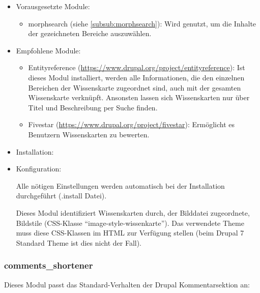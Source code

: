 \begin{itemize}[parsep=0pt, itemsep=5.0pt plus 2.0pt minus 1.0pt, leftmargin=*]
	\item Vorausgesetzte Module:

	\begin{itemize}
		\item morphsearch (siehe \cref{subsub:morphsearch}): Wird genutzt, um die Inhalte der gezeichneten Bereiche auszuwählen.
	\end{itemize}


	\item Empfohlene Module:

	\begin{itemize}
		\item Entityreference (\url{https://www.drupal.org/project/entityreference}): Ist dieses Modul installiert, werden alle Informationen, die den einzelnen Bereichen der Wissenskarte zugeordnet sind, auch mit der gesamten Wissenskarte verknüpft. Ansonsten lassen sich Wissenskarten nur über Titel und Beschreibung per Suche finden.

		\item Fivestar (\url{https://www.drupal.org/project/fivestar}): Ermöglicht es Benutzern Wissenskarten zu bewerten.
	\end{itemize}


	\item Installation: \standardinstall


	\item Konfiguration:

	\noconfig

	Alle nötigen Einstellungen werden automatisch bei der Installation durchgeführt (.install Datei).

	Dieses Modul identifiziert Wissenskarten durch, der Bilddatei zugeordnete, Bildstile (\zB CSS-Klasse \enquote{image-style-wissenkarte}). Das verwendete Theme muss diese CSS-Klassen im HTML zur Verfügung stellen (beim Drupal 7 Standard Theme ist dies nicht der Fall).
\end{itemize}



\subsubsection{comments\_shortener}\label{subsub:commentsshortener}
Dieses Modul passt das Standard-Verhalten der Drupal Kommentarsektion an:

